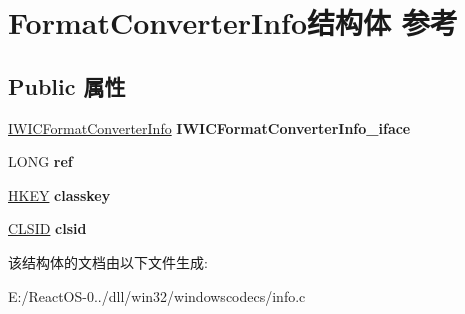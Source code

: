 \hypertarget{struct_format_converter_info}{}\section{Format\+Converter\+Info结构体 参考}
\label{struct_format_converter_info}
\subsection*{Public 属性}
\begin{DoxyCompactItemize}
\item 
\mbox{\label{struct_format_converter_info_a00bafe80573b5626416ce0968fe6acfb}} 
\hyperlink{interface_i_w_i_c_format_converter_info}{I\+W\+I\+C\+Format\+Converter\+Info} {\bfseries I\+W\+I\+C\+Format\+Converter\+Info\+\_\+iface}
\item 
\mbox{\label{struct_format_converter_info_a23f585e7a839afc4f2b1566c113d7610}} 
L\+O\+NG {\bfseries ref}
\item 
\mbox{\label{struct_format_converter_info_a47c4de878cb4326a432d9b8b65825875}} 
\hyperlink{interfacevoid}{H\+K\+EY} {\bfseries classkey}
\item 
\mbox{\label{struct_format_converter_info_a035703283c678c6233f25be0d20ddfaf}} 
\hyperlink{struct___i_i_d}{C\+L\+S\+ID} {\bfseries clsid}
\end{DoxyCompactItemize}


该结构体的文档由以下文件生成\+:\begin{DoxyCompactItemize}
\item 
E\+:/\+React\+O\+S-\/0../dll/win32/windowscodecs/info.\+c\end{DoxyCompactItemize}
